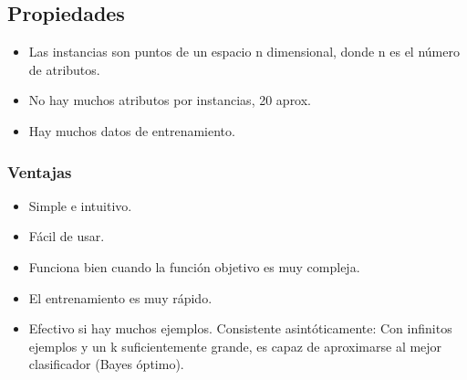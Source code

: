 \documentclass[12pt]{report} %
\begin{document}
\subsection{Propiedades}
\begin{itemize}
  \item Las instancias son puntos de un espacio n dimensional, donde n es el número de atributos.

  \item No hay muchos atributos por instancias, 20 aprox.

  \item Hay muchos datos de entrenamiento.

\end{itemize}

\subsubsection{Ventajas}
\begin{itemize}
  \item Simple e intuitivo.

  \item Fácil de usar.

  \item Funciona bien cuando la función objetivo es muy compleja.

  \item El entrenamiento es muy rápido.

  \item Efectivo si hay muchos ejemplos. Consistente asintóticamente: Con infinitos ejemplos y un k suficientemente grande, es capaz de aproximarse al mejor clasificador (Bayes óptimo).

\end{itemize}
\end{document}
